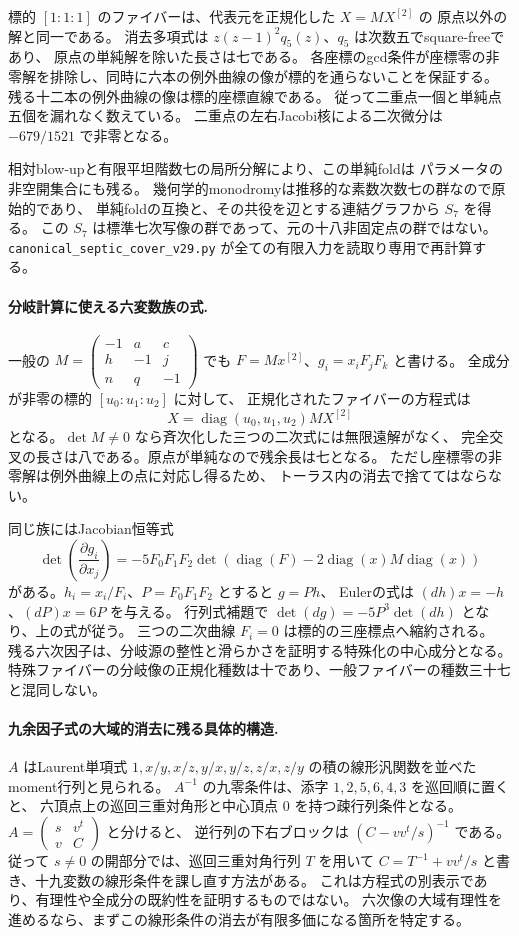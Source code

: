 標的 $[1:1:1]$ のファイバーは、代表元を正規化した $X=MX^{[2]}$ の
原点以外の解と同一である。
消去多項式は $z(z-1)^2q_5(z)$、$q_5$ は次数五でsquare-freeであり、
原点の単純解を除いた長さは七である。
各座標のgcd条件が座標零の非零解を排除し、同時に六本の例外曲線の像が標的を通らないことを保証する。
残る十二本の例外曲線の像は標的座標直線である。
従って二重点一個と単純点五個を漏れなく数えている。
二重点の左右Jacobi核による二次微分は $-679/1521$ で非零となる。

相対blow-upと有限平坦階数七の局所分解により、この単純foldは
パラメータの非空開集合にも残る。
幾何学的monodromyは推移的な素数次数七の群なので原始的であり、
単純foldの互換と、その共役を辺とする連結グラフから $S_7$ を得る。
この $S_7$ は標準七次写像の群であって、元の十八非固定点の群ではない。
\nolinkurl{canonical_septic_cover_v29.py} が全ての有限入力を読取り専用で再計算する。

\paragraph{分岐計算に使える六変数族の式.}
一般の $M=\left(\begin{smallmatrix}-1&a&c\\h&-1&j\\n&q&-1\end{smallmatrix}\right)$ でも
$F=Mx^{[2]}$、$g_i=x_iF_jF_k$ と書ける。
全成分が非零の標的 $[u_0:u_1:u_2]$ に対して、
正規化されたファイバーの方程式は
\[
 X=\operatorname{diag}(u_0,u_1,u_2)M X^{[2]}
\]
となる。$\det M\ne0$ なら斉次化した三つの二次式には無限遠解がなく、
完全交叉の長さは八である。原点が単純なので残余長は七となる。
ただし座標零の非零解は例外曲線上の点に対応し得るため、
トーラス内の消去で捨ててはならない。

同じ族にはJacobian恒等式
\[
 \det\left(\frac{\partial g_i}{\partial x_j}\right)
 =-5F_0F_1F_2
 \det\left(\operatorname{diag}(F)
       -2\operatorname{diag}(x)M\operatorname{diag}(x)\right)
\]
がある。$h_i=x_i/F_i$、$P=F_0F_1F_2$ とすると $g=Ph$、
Eulerの式は $(dh)x=-h$、$(dP)x=6P$ を与える。
行列式補題で $\det(dg)=-5P^3\det(dh)$ となり、上の式が従う。
三つの二次曲線 $F_i=0$ は標的の三座標点へ縮約される。
残る六次因子は、分岐源の整性と滑らかさを証明する特殊化の中心成分となる。
特殊ファイバーの分岐像の正規化種数は十であり、一般ファイバーの種数三十七と混同しない。

\paragraph{九余因子式の大域的消去に残る具体的構造.}
$A$ はLaurent単項式 $1,x/y,x/z,y/x,y/z,z/x,z/y$ の積の線形汎関数を並べたmoment行列と見られる。
$A^{-1}$ の九零条件は、添字 $1,2,5,6,4,3$ を巡回順に置くと、
六頂点上の巡回三重対角形と中心頂点 $0$ を持つ疎行列条件となる。
$A=\left(\begin{smallmatrix}s&v^t\\v&C\end{smallmatrix}\right)$ と分けると、
逆行列の下右ブロックは $(C-vv^t/s)^{-1}$ である。
従って $s\ne0$ の開部分では、巡回三重対角行列 $T$ を用いて
$C=T^{-1}+vv^t/s$ と書き、十九変数の線形条件を課し直す方法がある。
これは方程式の別表示であり、有理性や全成分の既約性を証明するものではない。
六次像の大域有理性を進めるなら、まずこの線形条件の消去が有限多価になる箇所を特定する。
